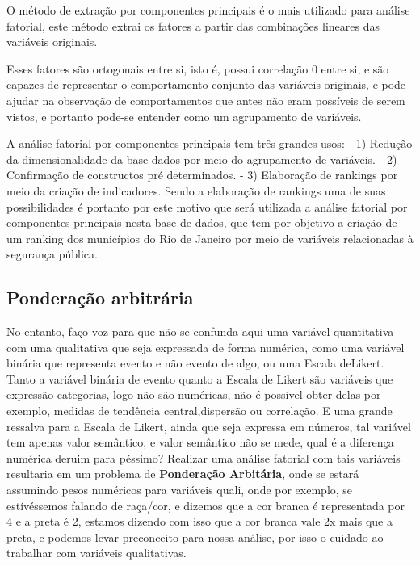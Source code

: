 \documentclass[
]{article}
\begin{document}
O método de extração por componentes principais é o mais utilizado para
análise fatorial, este método extrai os fatores a partir das combinações
lineares das variáveis originais.

Esses fatores são ortogonais entre si, isto é, possui correlação 0 entre
si, e são capazes de representar o comportamento conjunto das variáveis
originais, e pode ajudar na observação de comportamentos que antes não
eram possíveis de serem vistos, e portanto pode-se entender como um
agrupamento de variáveis.

A análise fatorial por componentes principais tem três grandes usos: -
1) Redução da dimensionalidade da base dados por meio do agrupamento de
variáveis. - 2) Confirmação de constructos pré determinados. - 3)
Elaboração de rankings por meio da criação de indicadores. Sendo a
elaboração de rankings uma de suas possibilidades é portanto por este
motivo que será utilizada a análise fatorial por componentes principais
nesta base de dados, que tem por objetivo a criação de um ranking dos
municípios do Rio de Janeiro por meio de variáveis relacionadas à
segurança pública.

\hypertarget{ponderauxe7uxe3o-arbitruxe1ria}{%
\subsection{Ponderação
arbitrária}\label{ponderauxe7uxe3o-arbitruxe1ria}}

No entanto, faço voz para que não se confunda aqui uma variável
quantitativa com uma qualitativa que seja expressada de forma numérica,
como uma variável binária que representa evento e não evento de algo, ou
uma Escala deLikert. Tanto a variável binária de evento quanto a Escala
de Likert são variáveis que expressão categorias, logo não são
numéricas, não é possível obter delas por exemplo, medidas de tendência
central,dispersão ou correlação. E uma grande ressalva para a Escala de
Likert, ainda que seja expressa em números, tal variável tem apenas
valor semântico, e valor semântico não se mede, qual é a diferença
numérica deruim para péssimo? Realizar uma análise fatorial com tais
variáveis resultaria em um problema de \textbf{Ponderação Arbitária},
onde se estará assumindo pesos numéricos para variáveis quali, onde por
exemplo, se estívéssemos falando de raça/cor, e dizemos que a cor branca
é representada por 4 e a preta é 2, estamos dizendo com isso que a cor
branca vale 2x mais que a preta, e podemos levar preconceito para nossa
análise, por isso o cuidado ao trabalhar com variáveis qualitativas.
\end{document}
